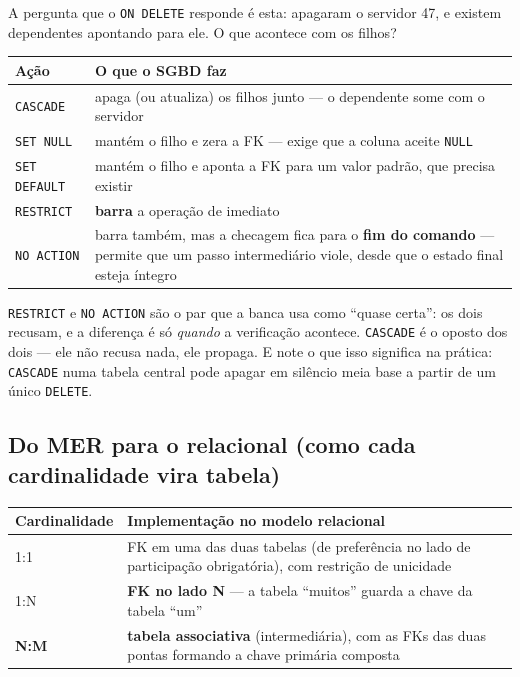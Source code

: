 \begin{conceito}
A pergunta que o \texttt{ON DELETE} responde é esta: apagaram o servidor 47, e
existem dependentes apontando para ele. O que acontece com os filhos?

\begin{center}
\begin{tabular}{@{}p{2.8cm}p{9.2cm}@{}}
\toprule
\textbf{Ação} & \textbf{O que o SGBD faz} \\
\midrule
\texttt{CASCADE} & apaga (ou atualiza) os filhos junto --- o dependente some com o servidor \\
\texttt{SET NULL} & mantém o filho e zera a FK --- exige que a coluna aceite \texttt{NULL} \\
\texttt{SET DEFAULT} & mantém o filho e aponta a FK para um valor padrão, que precisa existir \\
\texttt{RESTRICT} & \textbf{barra} a operação de imediato \\
\texttt{NO ACTION} & barra também, mas a checagem fica para o \textbf{fim do comando} --- permite que um passo intermediário viole, desde que o estado final esteja íntegro \\
\bottomrule
\end{tabular}
\end{center}

\texttt{RESTRICT} e \texttt{NO ACTION} são o par que a banca usa como
``quase certa'': os dois recusam, e a diferença é só \emph{quando} a
verificação acontece. \texttt{CASCADE} é o oposto dos dois --- ele não recusa
nada, ele propaga. E note o que isso significa na prática: \texttt{CASCADE}
numa tabela central pode apagar em silêncio meia base a partir de um único
\texttt{DELETE}.
\end{conceito}

\subsection{Do MER para o relacional (como cada cardinalidade vira tabela)}

\begin{center}
\begin{tabular}{@{}p{2.2cm}p{9.8cm}@{}}
\toprule
\textbf{Cardinalidade} & \textbf{Implementação no modelo relacional} \\
\midrule
1:1 & FK em uma das duas tabelas (de preferência no lado de participação obrigatória), com restrição de unicidade \\
1:N & \textbf{FK no lado N} --- a tabela ``muitos'' guarda a chave da tabela ``um'' \\
\textbf{N:M} & \textbf{tabela associativa} (intermediária), com as FKs das duas pontas formando a chave primária composta \\
\bottomrule
\end{tabular}
\end{center}

